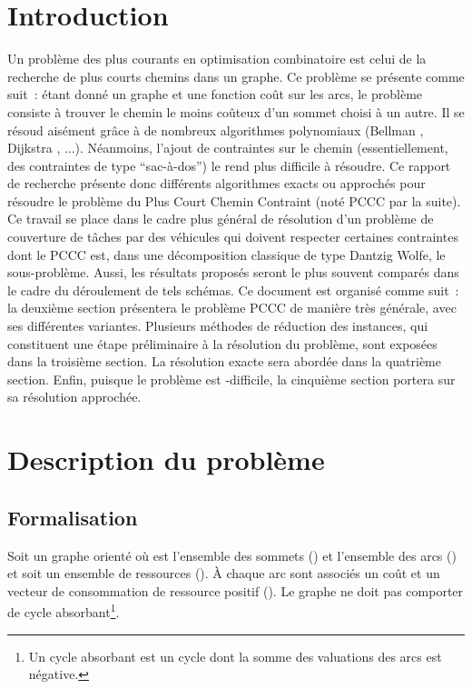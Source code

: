 \documentclass[10pt,francais]{llncs}
\begin{document}
\section{Introduction}\label{sec-intro}
Un probl\`eme des plus courants en optimisation combinatoire est celui de la recherche de plus courts chemins dans un graphe. Ce probl\`eme se pr\'esente comme suit~: \'etant donn\'e un graphe et une fonction co\^ut sur les arcs, le probl\`eme consiste \`a trouver le chemin le moins co\^uteux d'un sommet choisi \`a un autre. Il se r\'esoud ais\'ement gr\^ace \`a de nombreux algorithmes polynomiaux  (Bellman \cite{Bellman1958}, Dijkstra \cite{Dijkstra1959}, ...). N\'eanmoins, l'ajout de contraintes sur le chemin (essentiellement, des contraintes de type ``sac-\`a-dos'') le rend plus difficile \`a r\'esoudre. Ce rapport de recherche pr\'esente donc diff\'erents algorithmes exacts ou approch\'es pour r\'esoudre le probl\`eme du Plus Court Chemin Contraint (not\'e PCCC par la suite). Ce travail se place dans le cadre plus g\'en\'eral de r\'esolution d'un probl\`eme de couverture de t\^aches par des v\'ehicules qui doivent respecter certaines contraintes dont le PCCC est, dans une d\'ecomposition classique  de type Dantzig Wolfe, le sous-probl\`eme. Aussi, les r\'esultats propos\'es seront le plus souvent compar\'es dans le cadre du d\'eroulement de tels sch\'emas. 
Ce document est organis\'e comme suit~: la deuxi\`eme section pr\'esentera le probl\`eme PCCC de mani\`ere tr\`es g\'en\'erale, avec ses diff\'erentes variantes. Plusieurs m\'ethodes de r\'eduction des instances, qui constituent une \'etape pr\'eliminaire \`a la r\'esolution du probl\`eme, sont expos\'ees dans la troisi\`eme section. La r\'esolution exacte sera abord\'ee dans la quatri\`eme section. Enfin, puisque le probl\`eme est -difficile, la cinqui\`eme section portera sur sa r\'esolution approch\'ee.

\section{Description du probl\`eme}\label{sec-desc}
\subsection{Formalisation}\label{sub-desc-form} 
Soit  un graphe orient\'e o\`u  est l'ensemble des sommets () et  l'ensemble des arcs () et soit  un ensemble de ressources (). \`A chaque arc  sont associ\'es un co\^ut  et un vecteur de consommation de ressource  positif (). Le graphe ne doit pas comporter de cycle absorbant\footnote{Un cycle absorbant est un cycle dont la somme des valuations des arcs est n\'egative.}.\\
\end{document}
